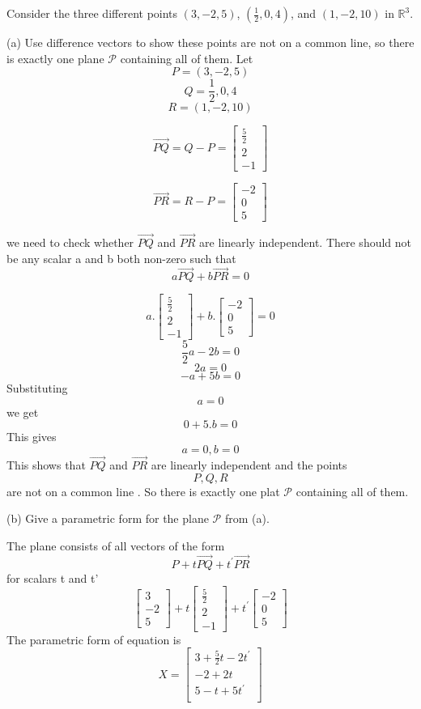 Consider the three different points $(3,-2,5)$, $(\frac{1}{2},0,4)$, and $(1,-2,10)$ in $\mathbb{R}^3$.

(a) Use difference vectors to show these points are not on a common line, so there is exactly one plane $\mathcal{P}$ containing all of them.
Let 
\[
P = (3,-2,5)
\]
\[
Q = \frac{1}{2},0,4
\]
\[
R = (1,-2,10)
\]

\[
\overrightarrow{PQ} = Q - P = \begin{bmatrix}
\frac{5}{2} \\ 2 \\ -1
\end{bmatrix}
\]

\[
\overrightarrow{PR} = R - P = \begin{bmatrix}
-2 \\ 0 \\ 5
\end{bmatrix}
\]

we need to check whether $\overrightarrow{PQ}$ and $\overrightarrow{PR}$ are linearly independent.
There should not be any scalar a and b both non-zero such that
\[
a \overrightarrow{PQ} + b \overrightarrow{PR} = 0
\]

\[
a . \begin{bmatrix}
\frac{5}{2} \\ 2 \\ -1
\end{bmatrix} + b . \begin{bmatrix}
-2 \\ 0 \\ 5
\end{bmatrix} = 0
\]
\[
\frac{5}{2}a - 2b = 0
\]
\[
2a  = 0
\]
\[
-a + 5b = 0
\]
Substituting
\[
a = 0
\]
we get
\[
 0 + 5.b =0
\]
This gives
\[
a = 0, b = 0
\]
This shows that $\overrightarrow{PQ}$ and $\overrightarrow{PR}$ are linearly independent and the points  
\[P, Q, R \]
are not on a common line . So there is exactly one plat $\mathcal{P}$ containing all of them.

(b) Give a parametric form for the plane $\mathcal{P}$ from (a).

The plane consists of all vectors of the form
\[
P + t\overrightarrow{PQ}+t^\prime\overrightarrow{PR} 
\]
for scalars t and t'
\[
\begin{bmatrix}
3 \\ -2 \\ 5
\end{bmatrix} + t \begin{bmatrix}
\frac{5}{2} \\ 2 \\ -1
\end{bmatrix} + t^\prime \begin{bmatrix}
-2 \\ 0 \\ 5
\end{bmatrix}
\]
The parametric form of equation is
\[
X =
\begin{bmatrix}
    3+\frac{5}{2} t -2 t^\prime \\ 
    -2 + 2t  \\
    5 - t + 5 t^\prime \\
\end{bmatrix}
\]
